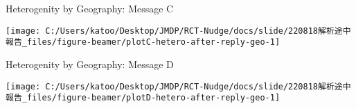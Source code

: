 \documentclass[
      aspectratio=169,
        12pt,
    ]{beamer}
\begin{document}
\begin{frame}{Heterogenity by Geography: Message C}
\protect\hypertarget{heterogenity-by-geography-message-c}{}
\begin{center}\texttt{[image: C:/Users/katoo/Desktop/JMDP/RCT-Nudge/docs/slide/220818解析途中報告\_files/figure-beamer/plotC-hetero-after-reply-geo-1]} \end{center}
\end{frame}

\begin{frame}{Heterogenity by Geography: Message D}
\protect\hypertarget{heterogenity-by-geography-message-d}{}
\begin{center}\texttt{[image: C:/Users/katoo/Desktop/JMDP/RCT-Nudge/docs/slide/220818解析途中報告\_files/figure-beamer/plotD-hetero-after-reply-geo-1]} \end{center}
\end{frame}
\end{document}

